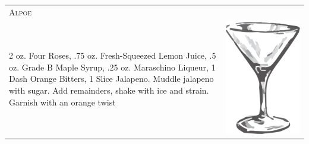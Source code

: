 \documentclass{article}
\begin{document}
\begin{tabular}{p{2in} p{0.5in}}
  \multicolumn{2}{p{3in}}{\centering\Huge\textsc{Alpoe}} \\ 
  
   \vspace{-0.1in}2 oz. Four Roses, .75 oz. Fresh-Squeezed Lemon Juice, .5 oz. Grade
    B Maple Syrup, .25 oz.  Maraschino Liqueur, 1 Dash Orange Bitters,
    1 Slice Jalapeno. Muddle jalapeno with sugar. Add remainders,
    shake with ice and strain. Garnish with an orange twist &
   \vspace{-0.1in} \includegraphics{goblet.png}
\end{tabular}
\end{document}
